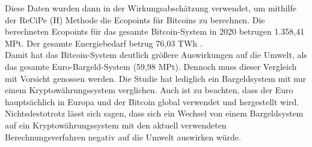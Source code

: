 \FloatBarrier
\noindent Diese Daten wurden dann in der Wirkungsabschätzung verwendet, um mithilfe der ReCiPe (H) Methode die Ecopoints für Bitcoins zu berechnen. Die berechneten Ecopoints für das gesamte Bitcoin-System in 2020 betrugen 1.358,41 MPt. Der gesamte Energiebedarf betrug 76,03 TWh .\\
Damit hat das Bitcoin-System deutlich größere Auswirkungen auf die Umwelt, als das gesamte Euro-Bargeld-System (59,98 MPt). Dennoch muss dieser Vergleich mit Vorsicht genossen werden. Die Studie hat lediglich ein Bargeldsystem mit nur einem Kryptowährungssystem verglichen. Auch ist zu beachten, dass der Euro hauptsächlich in Europa und der Bitcoin global verwendet und hergestellt wird. Nichtsdestotrotz lässt sich sagen, dass sich ein Wechsel von einem Bargeldsystem auf ein Kryptowährungssystem mit den aktuell verwendeten Berechnungsverfahren negativ auf die Umwelt auswirken würde.